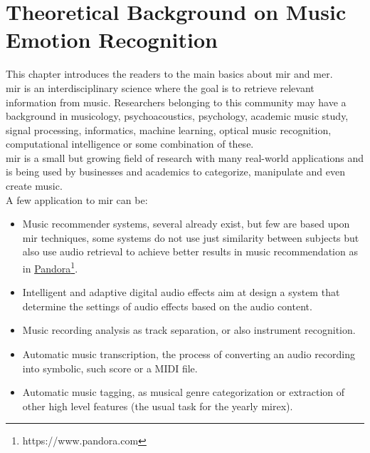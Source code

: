 \chapter{Theoretical Background on Music Emotion Recognition}
\label{chap:TheoreticalBackgroundMER}
\pagestyle{plain}
\vspace{0.5cm}

This chapter introduces the readers to the main basics about \gls{mir} and \gls{mer}.
\\
\gls{mir} is an interdisciplinary science where the goal is to retrieve relevant information from music. Researchers belonging to this community may have a background in musicology, psychoacoustics, psychology, academic music study, signal processing, informatics, machine learning, optical music recognition, computational intelligence or some combination of these.
\\ \indent
\gls{mir} is a small but growing field of research with many real-world applications and is being used by businesses and academics to categorize, manipulate and even create music.
\\
A few application to \gls{mir} can be:
\begin{itemize}
	\item Music recommender systems, several already exist, but few are based upon \gls{mir} techniques, some systems do not use just similarity between subjects but also use audio retrieval to achieve better results in music recommendation as in \href{https://www.pandora.com}{Pandora}\footnote{https://www.pandora.com}. 
	\item Intelligent and adaptive digital audio effects aim at design a system that determine the settings of audio effects based on the audio content.
	\item Music recording analysis as track separation, or also instrument recognition.
	\item Automatic music transcription, the process of converting an audio recording into symbolic, such score or a MIDI file.
	\item Automatic music tagging, as musical genre categorization or extraction of other high level features (the usual task for the yearly \gls{mirex}).
\end{itemize}

